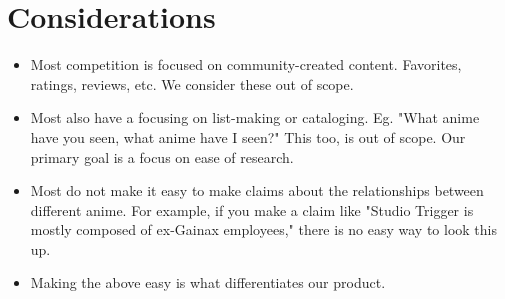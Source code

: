 \documentclass[a4paper]{article}
\begin{document}
\section{Considerations}
\begin{itemize}
  \item Most competition is focused on community-created content. Favorites, ratings, reviews, etc. We consider these out of scope.
  \item Most also have a focusing on list-making or cataloging. Eg. "What anime have you seen, what anime have I seen?" This too, is out of scope. Our primary goal is a focus on ease of research.
  \item Most do not make it easy to make claims about the relationships between different anime. For example, if you make a claim like "Studio Trigger is mostly composed of ex-Gainax employees," there is no easy way to look this up. 
  \item Making the above easy is what differentiates our product.
\end{itemize}
\end{document}
